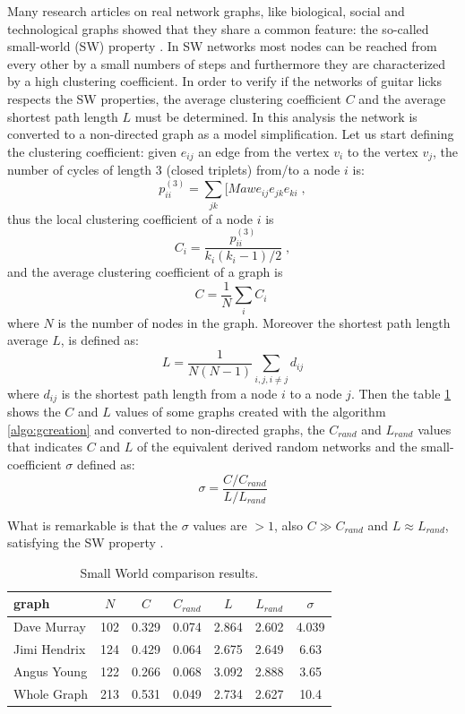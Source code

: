 \documentclass{llncs}
\begin{document}
Many research articles on real network graphs, like biological, 
social and technological graphs showed that they share a common
feature: the so-called small-world (SW) property \cite{sw-watts}.
In SW networks most nodes can be reached from every other by a small
numbers of steps and furthermore they are characterized by a high
clustering coefficient. In order to verify if the networks of guitar
licks respects the SW properties, the average clustering coefficient $C$ and the
average shortest path length $L$ must be determined\cite{sw-ubiquity}. In this analysis
the network is converted to a non-directed graph as a model
simplification. Let us start defining 
the clustering coefficient: given $e_{ij}$ an edge from the vertex $v_i$
to the vertex $v_j$, the number of cycles of length 3 (closed triplets) from/to a node $i$ is:
\[ p_{ii}^{(3)} = \sum_{jk}[Maw{e_{ij}e_{jk}e_{ki}}\;, \]
thus the local clustering coefficient of a node $i$ is 
\[ C_i = \frac{p_{ii}^{(3)}}{k_i(k_i-1)/2} \; ,\]
and the average clustering coefficient of a graph is
\[ C = \frac{1}{N} \sum_{i}{C_i} \;  \]
where $N$ is the number of nodes in the graph.
Moreover the shortest path length average $L$, is defined as:
\[ L = \frac{1}{N(N - 1)} \sum_{i,j,i \neq j}{d_{ij}} \]
where $d_{ij}$ is the shortest path length from a node $i$ to a node
$j$.
Then the table \ref{tab:sw} shows the $C$ and $L$ values of some graphs created with the algorithm
\ref{algo:gcreation} and converted to non-directed graphs, the $C_{rand}$
and $L_{rand}$ values that indicates $C$ and $L$ of the equivalent
derived random networks and the small-coefficient $\sigma$ defined as:
\[ \sigma = \frac{C / C_{rand}}{L / L_{rand}} \]

What is remarkable is that the $\sigma$ values are $> 1$, also $C \gg
C_{rand}$ and $L \approx L_{rand}$, satisfying the SW property
\cite{sw-ubiquity}.
\setlength{\tabcolsep}{8pt}
\begin{table}
\begin{center}
  \begin{tabular}{ l c c c c c c  }
    \hline
    graph  & $N$ & $C$ & $C_{rand}$ & $L$ & $L_{rand}$ & $\sigma$ \\ \hline
    Dave Murray & 102 & 0.329 & 0.074 & 2.864 & 2.602 & 4.039 \\
	Jimi Hendrix & 124 & 0.429 & 0.064 & 2.675 & 2.649 & 6.63 \\
	Angus Young & 122 & 0.266 & 0.068 & 3.092 & 2.888 & 3.65 \\ 
	Whole Graph & 213 & 0.531 & 0.049 & 2.734 & 2.627 & 10.4 \\
    \hline
  \end{tabular}
\end{center}
  \caption{Small World comparison results.}
  \label{tab:sw}
\end{table}
 
\end{document}
